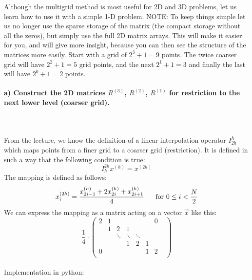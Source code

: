 Although the multigrid method is most useful for 2D and 3D problems,
let us learn how to use it with a simple 1-D problem.
NOTE: To keep things simple let us no longer use the sparse storage of
the matrix (the compact storage without all the zeros), but simply use
the full 2D matrix arrays. This will make it easier for you, and will
give more insight, because you can then see the structure of the
matrices more easily.
Start with a grid of $2^3+1=9$ points. The twice coarser grid will have
$2^2+1=5$ grid points, and the next $2^1+1=3$ and finally the last will
have $2^0+1=2$ points.

\paragraph{
    a) Construct the 2D matrices $R^{(3)}$, $R^{(2)}$, $R^{(1)}$
    for restriction to the next lower level (coarser grid).
} \ \\
    \\
    From the lecture, we know the definition of a linear
    interpolation operator $I_{2h}^h$ which maps points from
    a finer grid to a coarser grid (restriction).  It is
    defined in such a way that the following condition is true:
    \begin{equation}
        I_h^{2h}x^{(h)}=x^{(2h)}
    \end{equation}
    The mapping is defined as follows:
    \begin{equation}
        x_i^{(2h)}=
        \frac{x_{2i-1}^{(h)}+2x_{2i}^{(h)}+x_{2i+1}^{(h)}}{4}
        \ \ \ \ \
        \textnormal{for }0\leq i<\frac{N}{2}
    \end{equation}
    We can express the mapping as a matrix acting on a vector
    $\vec x$ like this:
    \begin{equation}
        \frac{1}{4}\cdot
        \begin{pmatrix}
            2      & 1 &    &   &        &        & 0 & \\
                   & 1 & 2  & 1 &        &        &        & \\
                   &   & \ddots & \ddots & \ddots &        & \\
                   &   &        & 1      & 2      & 1      & \\
            0 &   &        &        &        & 1      & 2 \\
        \end{pmatrix}
    \end{equation} \ \\
    Implementation in python:
    

